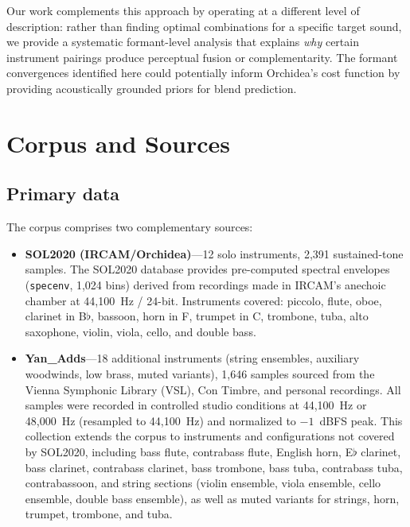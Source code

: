 \documentclass[12pt,a4paper]{article}
\begin{document}
Our work complements this approach by operating at a different level of
description: rather than finding optimal combinations for a specific target
sound, we provide a systematic formant-level analysis that explains
\emph{why} certain instrument pairings produce perceptual fusion or
complementarity. The formant convergences identified here could potentially
inform Orchidea's cost function by providing acoustically grounded priors for
blend prediction.

\section{Corpus and Sources}
\label{sec:corpus}

\subsection{Primary data}

The corpus comprises two complementary sources:

\begin{itemize}
\item \textbf{SOL2020 (IRCAM/Orchidea)}---12 solo instruments, 2,391 sustained-tone
samples. The SOL2020 database provides pre-computed spectral envelopes
(\texttt{specenv}, 1,024 bins) derived from recordings made in IRCAM's
anechoic chamber at 44,100~Hz / 24-bit. Instruments covered: piccolo, flute,
oboe, clarinet in B$\flat$, bassoon, horn in F, trumpet in C, trombone, tuba,
alto saxophone, violin, viola, cello, and double bass.

\item \textbf{Yan\_Adds}---18 additional instruments (string ensembles, auxiliary
woodwinds, low brass, muted variants), 1,646 samples sourced from the Vienna
Symphonic Library (VSL), Con Timbre, and personal recordings. All samples were
recorded in controlled studio conditions at 44,100~Hz or 48,000~Hz (resampled
to 44,100~Hz) and normalized to $-1$~dBFS peak. This collection extends the
corpus to instruments and configurations not covered by SOL2020, including
bass flute, contrabass flute, English horn, E$\flat$ clarinet, bass clarinet,
contrabass clarinet, bass trombone, bass tuba, contrabass tuba, contrabassoon,
and string sections (violin ensemble, viola ensemble, cello ensemble, double
bass ensemble), as well as muted variants for strings, horn, trumpet,
trombone, and tuba.
\end{itemize}
\end{document}
